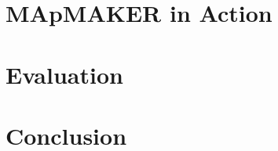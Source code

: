 \documentclass[10pt,conference]{IEEEtran}
\begin{document}
	\section{MApMAKER in Action}
	\label{sec:tool}
	
	
	
	\section{Evaluation}
	\label{sec:evaluation}
	
	
	
	\section{Conclusion}
	\label{sec:conclusion}
	



	\balance
	
	
	
\end{document}
